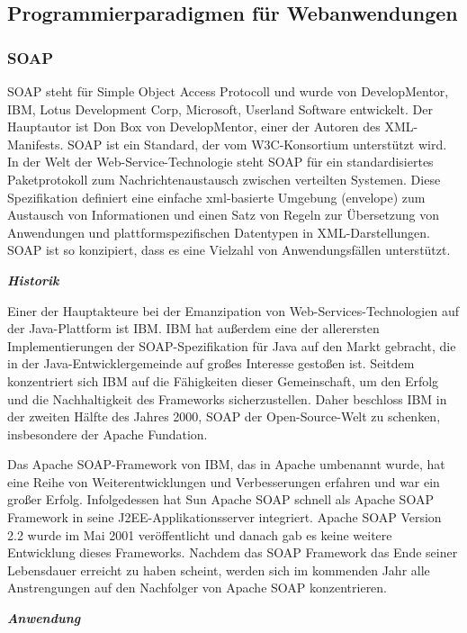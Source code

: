 
\subsection{Programmierparadigmen für Webanwendungen}
\subsubsection{SOAP}
SOAP steht für Simple Object Access Protocoll und wurde von DevelopMentor, IBM, Lotus Development Corp, Microsoft, Userland Software entwickelt. Der Hauptautor ist Don Box von DevelopMentor, einer der Autoren des XML-Manifests. SOAP ist ein Standard, der vom W3C-Konsortium unterstützt wird. In der Welt der Web-Service-Technologie steht SOAP für ein standardisiertes Paketprotokoll zum Nachrichtenaustausch zwischen verteilten Systemen. Diese Spezifikation definiert eine einfache xml-basierte Umgebung (envelope) zum Austausch von Informationen und einen Satz von Regeln zur Übersetzung von Anwendungen und plattformspezifischen Datentypen in XML-Darstellungen. SOAP ist so konzipiert, dass es eine Vielzahl von Anwendungsfällen unterstützt.\cite{saop1}

\textit{\textbf{Historik}}

Einer der Hauptakteure bei der Emanzipation von Web-Services-Technologien auf der Java-Plattform ist IBM. IBM hat außerdem eine der allerersten Implementierungen der SOAP-Spezifikation für Java auf den Markt gebracht, die in der Java-Entwicklergemeinde auf großes Interesse gestoßen ist. Seitdem konzentriert sich IBM auf die Fähigkeiten dieser Gemeinschaft, um den Erfolg und die Nachhaltigkeit des Frameworks sicherzustellen. Daher beschloss IBM in der zweiten Hälfte des Jahres 2000, SOAP der Open-Source-Welt zu schenken, insbesondere der Apache Fundation.

Das Apache SOAP-Framework von IBM, das in Apache umbenannt wurde, hat eine Reihe von Weiterentwicklungen und Verbesserungen erfahren und war ein großer Erfolg. Infolgedessen hat Sun Apache SOAP schnell als Apache SOAP Framework in seine J2EE-Applikationsserver integriert. Apache SOAP Version 2.2 wurde im Mai 2001 veröffentlicht und danach gab es keine weitere Entwicklung dieses Frameworks. Nachdem das SOAP Framework das Ende seiner Lebensdauer erreicht zu haben scheint, werden sich im kommenden Jahr alle Anstrengungen auf den Nachfolger von Apache SOAP konzentrieren.

\textit{\textbf{Anwendung}}

